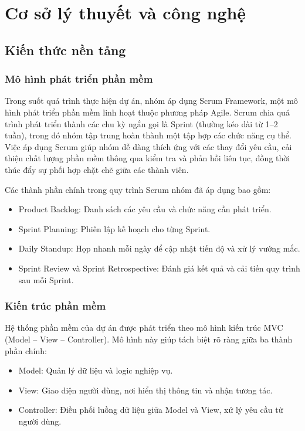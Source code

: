 \section{Cơ sở lý thuyết và công nghệ}
\subsection{Kiến thức nền tảng}
\subsubsection{Mô hình phát triển phần mềm}

Trong suốt quá trình thực hiện dự án, nhóm áp dụng Scrum Framework, một mô hình phát triển phần mềm linh hoạt thuộc phương pháp Agile. Scrum chia quá trình phát triển thành các chu kỳ ngắn gọi là Sprint (thường kéo dài từ 1–2 tuần), trong đó nhóm tập trung hoàn thành một tập hợp các chức năng cụ thể. Việc áp dụng Scrum giúp nhóm dễ dàng thích ứng với các thay đổi yêu cầu, cải thiện chất lượng phần mềm thông qua kiểm tra và phản hồi liên tục, đồng thời thúc đẩy sự phối hợp chặt chẽ giữa các thành viên.

Các thành phần chính trong quy trình Scrum nhóm đã áp dụng bao gồm:
\begin{itemize}
    \item Product Backlog: Danh sách các yêu cầu và chức năng cần phát triển.
    \item Sprint Planning: Phiên lập kế hoạch cho từng Sprint.
    \item Daily Standup: Họp nhanh mỗi ngày để cập nhật tiến độ và xử lý vướng mắc.
    \item Sprint Review và Sprint Retrospective: Đánh giá kết quả và cải tiến quy trình sau mỗi Sprint.
\end{itemize}

\subsubsection{Kiến trúc phần mềm}

Hệ thống phần mềm của dự án được phát triển theo mô hình kiến trúc MVC (Model – View – Controller). Mô hình này giúp tách biệt rõ ràng giữa ba thành phần chính:
\begin{itemize}
    \item Model: Quản lý dữ liệu và logic nghiệp vụ.
    \item View: Giao diện người dùng, nơi hiển thị thông tin và nhận tương tác.
    \item Controller: Điều phối luồng dữ liệu giữa Model và View, xử lý yêu cầu từ người dùng.
\end{itemize}

